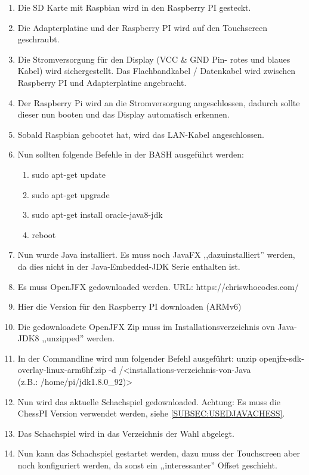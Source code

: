 \documentclass[12pt,a4paper]{article}
\begin{document}
{\begin{enumerate}
	\item{Die SD Karte mit Raspbian wird in den Raspberry PI gesteckt.}
	\item{Die Adapterplatine und der Raspberry PI wird auf den Touchscreen geschraubt.}
	\item{Die Stromversorgung für den Display (VCC \& GND Pin- rotes und blaues Kabel) wird sichergestellt. Das Flachbandkabel / Datenkabel wird zwischen Raspberry PI und Adapterplatine angebracht.}
	\item{Der Raspberry Pi wird an die Stromversorgung angeschlossen, dadurch sollte dieser nun booten und das Display automatisch erkennen.}
	\item{Sobald Raspbian gebootet hat, wird das LAN-Kabel angeschlossen.}
	\item{Nun sollten folgende Befehle in der BASH ausgeführt werden:}
	\begin{enumerate}
		\item{sudo apt-get update}
		\item{sudo apt-get upgrade}
		\item{sudo apt-get install oracle-java8-jdk}
		\item{reboot}
	\end{enumerate}
	\item{Nun wurde Java installiert. Es muss noch JavaFX ,,dazuinstalliert'' werden, da dies nicht in der Java-Embedded-JDK Serie enthalten ist.}
	\item{Es muss OpenJFX gedownloaded werden. URL: https://chriswhocodes.com/}
	\item{Hier die Version für den Raspberry PI downloaden (ARMv6)}
	\item{Die gedownloadete OpenJFX Zip muss im Installationsverzeichnis ovn Java-JDK8 ,,unzipped'' werden.}
	\item{In der Commandline wird nun folgender Befehl ausgeführt: unzip openjfx-sdk-overlay-linux-arm6hf.zip -d /<installations-verzeichnis-von-Java \\
	(z.B.: /home/pi/jdk1.8.0\_92)>}
	\item{Nun wird das aktuelle Schachspiel gedownloaded. Achtung: Es muss die ChessPI Version verwendet werden, siehe \ref{SUBSEC:USEDJAVACHESS}}.
	\item{Das Schachspiel wird in das Verzeichnis der Wahl abgelegt.}
	\item{Nun kann das Schachspiel gestartet werden, dazu muss der Touchscreen aber noch konfiguriert werden, da sonst ein ,,interessanter'' Offset geschieht.}

\end{enumerate}}
\end{document}
